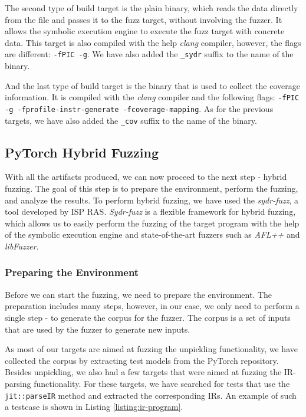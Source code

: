 
The second type of build target is the plain binary, which reads the data directly from the file and passes it to the fuzz target, without involving the fuzzer. It allows the symbolic execution engine to execute the fuzz target with concrete data. This target is also compiled with the help \textit{clang} compiler, however, the flags are different: \texttt{-fPIC -g}. We have also added the \texttt{\_sydr} suffix to the name of the binary.


And the last type of build target is the binary that is used to collect the coverage information. It is compiled with the \textit{clang} compiler and the following flags: \texttt{-fPIC -g -fprofile-instr-generate -fcoverage-mapping}. As for the previous targets, we have also added the \texttt{\_cov} suffix to the name of the binary.

\subsection{PyTorch Hybrid Fuzzing}

With all the artifacts produced, we can now proceed to the next step - hybrid fuzzing. The goal of this step is to prepare the environment, perform the fuzzing, and analyze the results. To perform hybrid fuzzing, we have used the \textit{sydr-fuzz}, a tool developed by ISP RAS. \textit{Sydr-fuzz} is a flexible framework for hybrid fuzzing, which allows us to easily perform the fuzzing of the target program with the help of the symbolic execution engine and state-of-the-art fuzzers such as \textit{AFL++} and \textit{libFuzzer}.

\subsubsection{Preparing the Environment}

Before we can start the fuzzing, we need to prepare the environment. The preparation includes many steps, however, in our case, we only need to perform a single step - to generate the corpus for the fuzzer. The corpus is a set of inputs that are used by the fuzzer to generate new inputs.

As most of our targets are aimed at fuzzing the unpickling functionality, we have collected the corpus by extracting test models from the PyTorch repository. Besides unpickling, we also had a few targets that were aimed at fuzzing the IR-parsing functionality. For these targets, we have searched for tests that use the \texttt{jit::parseIR} method and extracted the corresponding IRs. An example of such a testcase is shown in Listing \ref{listing:ir-program}.

